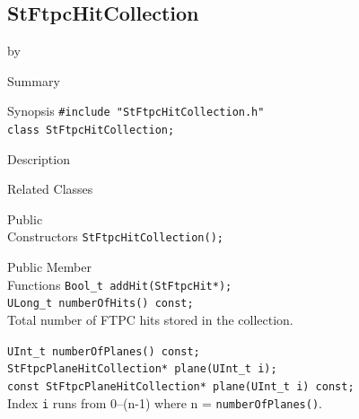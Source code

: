 \documentclass[twoside]{article}
\newcommand{\entrylabel}[1]{\mbox{\textbf{{#1}}}\hfil}%
\newenvironment{entry}
{\begin{list}{}%
    {\renewcommand{\makelabel}{\entrylabel}%
     \setlength{\labelwidth}{90pt}%
     \setlength{\leftmargin}{\labelwidth}
     \advance\leftmargin by \labelsep%
      }%
    }%
  {\end{list}}
\newcommand{\Entrylabel}[1]%
{\raisebox{0pt}[1ex][0pt]{\makebox[\labelwidth][l]%
    {\parbox[t]{\labelwidth}{\hspace{0pt}\textbf{{#1}}}}}}
\newenvironment{Entry}%
{\renewcommand{\entrylabel}{\Entrylabel}\begin{entry}}%
  {\end{entry}}
\begin{document}
\subsection{StFtpcHitCollection}
\label{sec:StFtpcHitCollection}
\begin{Entry}
\item[Summary]
\item[Synopsis]
    \verb+#include "StFtpcHitCollection.h"+\\
    \verb+class StFtpcHitCollection;+\\
\item[Description]
\item[Related Classes]
\item[Public\\ Constructors]
    \verb+StFtpcHitCollection();+\\
\item[Public Member\\ Functions]
    \verb+Bool_t addHit(StFtpcHit*);+\\
    
    \verb+ULong_t numberOfHits() const;+\\
    Total number of FTPC hits stored in the collection.
    
    \verb+UInt_t numberOfPlanes() const;+\\
    
    \verb+StFtpcPlaneHitCollection* plane(UInt_t i);+\\
    \verb+const StFtpcPlaneHitCollection* plane(UInt_t i) const;+\\
    Index \texttt{i} runs from 0--(n-1) where n =
    \texttt{numberOfPlanes()}.
\end{Entry}
\clearpage
\end{document}
